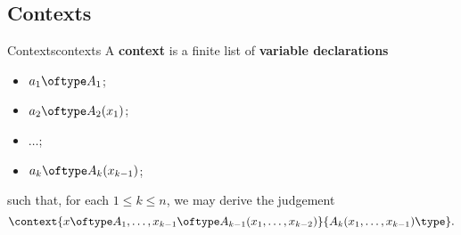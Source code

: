\subsection{Contexts}\label{subsection-contexts}
\begin{definition}{Contexts}{contexts}%
    A \textbf{context} is a finite list of \textbf{variable declarations}
    \begin{itemize}
        \item $a_{1}\oftype A_{1}$;
        \item $a_{2}\oftype A_{2}(x_{1})$;
        \item $\ldots$;
        \item $a_{k}\oftype A_{k}(x_{k-1})$;
    \end{itemize}
    such that, for each $1\leq k\leq n$, we may derive the judgement
    \[
        \context{x\oftype A_{1},\ldots,x_{k-1}\oftype A_{k-1}(x_{1},\ldots,x_{k-2})}{A_{k}(x_{1},\ldots,x_{k-1})\type}.%
    \]%
\end{definition}
